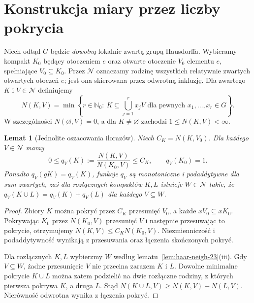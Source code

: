\documentclass[11pt,a4paper,oneside]{book}
\numberwithin{equation}{chapter}
\theoremstyle{plain}
\newtheorem{lemat}[twierdzenie]{Lemat}
\theoremstyle{definition}
\theoremstyle{remark}
\begin{document}
\section{Konstrukcja miary przez liczby pokrycia}
Niech odtąd $G$ będzie \emph{dowolną} lokalnie zwartą
grupą Hausdorffa. Wybieramy kompakt $K_0$ będący otoczeniem $e$
oraz otwarte otoczenie $V_0$ elementu $e$,
spełniające $V_0\subseteq K_0$. Przez $\mathcal N$
oznaczamy rodzinę wszystkich relatywnie zwartych otwartych
otoczeń $e$; jest ona skierowana przez odwrotną inkluzję.
Dla zwartego $K$ i $V\in\mathcal N$ definiujemy
\begin{equation}\label{eq:haar-cover-number-23}
 N(K,V)=\min\left\{r\in\mathbb N_0:\
 K\subseteq\bigcup_{j=1}^{r}x_jV
 \text{ dla pewnych }x_1,\dots,x_r\in G\right\}.
\end{equation}
W szczególności $N(\varnothing,V)=0$, a dla
$K\ne\varnothing$ zachodzi $1\le N(K,V)<\infty$.

\begin{lemat}[Jednolite oszacowania ilorazów]
\label{lem:haar-ratio-23}
Niech $C_K=N(K,V_0)$. Dla każdego $V\in\mathcal N$ mamy
\[
 0\le q_V(K):=\frac{N(K,V)}{N(K_0,V)}\le C_K,
 \qquad q_V(K_0)=1.
\]
Ponadto $q_V(gK)=q_V(K)$, funkcje $q_V$ są monotoniczne
i podaddytywne dla sum zwartych, zaś dla rozłącznych
kompaktów $K,L$ istnieje $W\in\mathcal N$ takie, że
$q_V(K\cup L)=q_V(K)+q_V(L)$ dla każdego $V\subseteq W$.
\end{lemat}
\begin{proof}
Zbiory $K$ można pokryć przez $C_K$ przesunięć $V_0$,
a każde $xV_0\subseteq xK_0$. Pokrywając $K_0$
przez $N(K_0,V)$ przesunięć $V$ i następnie przesuwając
to pokrycie, otrzymujemy $N(K,V)\le C_KN(K_0,V)$.
Niezmienniczość i podaddytywność wynikają z przesuwania
oraz łączenia skończonych pokryć.

Dla rozłącznych $K,L$ wybierzmy $W$ według
lematu~\ref{lem:haar-neigh-23}(iii). Gdy $V\subseteq W$,
żadne przesunięcie $V$ nie przecina zarazem $K$ i $L$.
Dowolne minimalne pokrycie $K\cup L$ można zatem
podzielić na dwie rozłączne rodziny, z których pierwsza
pokrywa $K$, a druga $L$. Stąd
$N(K\cup L,V)\ge N(K,V)+N(L,V)$.
Nierówność odwrotna wynika z łączenia pokryć.
\end{proof}
\end{document}
